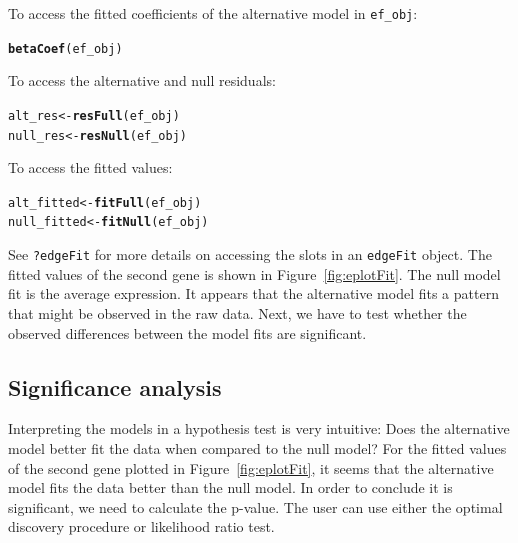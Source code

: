 \documentclass{article}\usepackage[]{graphicx}\usepackage[]{color}
\makeatletter
\newcommand{\hlstd}[1]{\textcolor[rgb]{0.345,0.345,0.345}{#1}}%
\newcommand{\hlkwb}[1]{\textcolor[rgb]{0.69,0.353,0.396}{#1}}%
\newcommand{\hlkwd}[1]{\textcolor[rgb]{0.737,0.353,0.396}{\textbf{#1}}}%
\newenvironment{kframe}{%
 \def\at@end@of@kframe{}%
 \ifinner\ifhmode%
  \def\at@end@of@kframe{\end{minipage}}%
  \begin{minipage}{\columnwidth}%
 \fi\fi%
 \def\FrameCommand##1{\hskip\@totalleftmargin \hskip-\fboxsep
 \colorbox{shadecolor}{##1}\hskip-\fboxsep
     \hskip-\linewidth \hskip-\@totalleftmargin \hskip\columnwidth}%
 \MakeFramed {\advance\hsize-\width
   \@totalleftmargin\z@ \linewidth\hsize
   \@setminipage}}%
 {\par\unskip\endMakeFramed%
 \at@end@of@kframe}
\newenvironment{knitrout}{}{} %
\makeatother
\begin{document}
To access the fitted coefficients of the alternative model in {\tt ef\_obj}:
\begin{knitrout}
\color{fgcolor}\begin{kframe}
\begin{alltt}
\hlkwd{betaCoef}\hlstd{(ef_obj)}
\end{alltt}
\end{kframe}
\end{knitrout}
To access the alternative and null residuals:
\begin{knitrout}
\color{fgcolor}\begin{kframe}
\begin{alltt}
\hlstd{alt_res} \hlkwb{<-} \hlkwd{resFull}\hlstd{(ef_obj)}
\hlstd{null_res} \hlkwb{<-} \hlkwd{resNull}\hlstd{(ef_obj)}
\end{alltt}
\end{kframe}
\end{knitrout}
To access the fitted values:
\begin{knitrout}
\color{fgcolor}\begin{kframe}
\begin{alltt}
\hlstd{alt_fitted} \hlkwb{<-} \hlkwd{fitFull}\hlstd{(ef_obj)}
\hlstd{null_fitted} \hlkwb{<-} \hlkwd{fitNull}\hlstd{(ef_obj)}
\end{alltt}
\end{kframe}
\end{knitrout}

See {\tt ?edgeFit} for more details on accessing the slots in an {\tt edgeFit} object. The fitted values of the second gene is shown in Figure~\ref{fig:eplotFit}. The null model fit is the average expression. It appears that the alternative model fits a pattern that might be observed in the raw data. Next, we have to test whether the observed differences between the model fits are significant.

\subsection{Significance analysis}
Interpreting the models in a hypothesis test is very intuitive: Does the alternative model better fit the data when compared to the null model? For the fitted values of the second gene plotted in Figure~\ref{fig:eplotFit}, it seems that the alternative model fits the data better than the null model. In order to conclude it is significant, we need to calculate the p-value. The user can use either the optimal discovery procedure or likelihood ratio test. 
\end{document}
